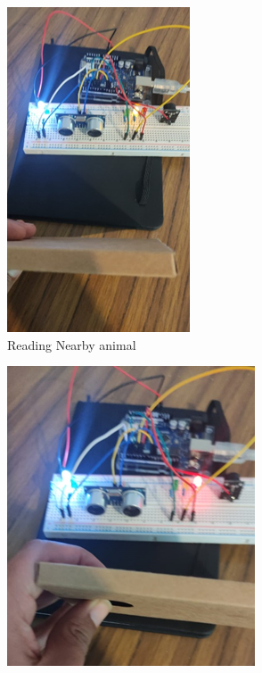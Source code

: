 \documentclass[12pt]{article}
\begin{document}
\begin{figure}[!h]
\begin{subfigure}{.5\textwidth}
  \includegraphics[width=.6\linewidth]{img/eye2.png}
  \caption{Reading Nearby animal}
  \label{fig:sub1}
\end{subfigure}%
\begin{subfigure}{.5\textwidth}
  \includegraphics[width=.6\linewidth]{img/eye4.png}

\end{subfigure}
\end{figure}
\end{document}

